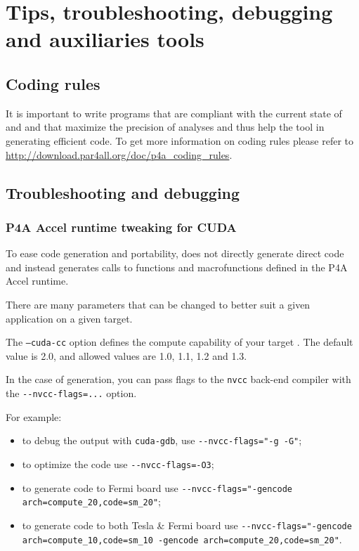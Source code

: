 \documentclass[a4paper]{article}
\begin{document}
\section{Tips, troubleshooting, debugging and auxiliaries tools}

\subsection{Coding rules}
It is important to write programs that are compliant with the
current state of \Apfa and \Apips and that maximize the precision of analyses and
thus help the tool in generating efficient code. To get more information on \Apfa 
coding rules please refer to \url{http://download.par4all.org/doc/p4a_coding_rules}.

\subsection{Troubleshooting and debugging}

\subsubsection{P4A Accel runtime tweaking for CUDA}
\label{sec:p4a-accel-runtime}

To ease code generation and portability, \Apfa does not directly generate
direct \Acuda code and instead generates calls to functions and
macrofunctions defined in the P4A Accel runtime.

There are many parameters that can be changed to better suit a given
application on a given target. 

The \texttt{--cuda-cc} option defines the compute capability of your target 
\Agpu. The default value is 2.0, and allowed values are 1.0, 1.1, 1.2 and 1.3. 

In the case of \Acuda generation, you can pass flags to the \texttt{nvcc}
back-end compiler with the \verb|--nvcc-flags=...| option.

For example:
\begin{itemize}
\item to debug the output with \texttt{cuda-gdb}, use
  \verb|--nvcc-flags="-g -G"|;
\item to optimize the \Acuda code use \verb|--nvcc-flags=-O3|;
\item  to generate code to Fermi board use
  \verb|--nvcc-flags="-gencode arch=compute_20,code=sm_20"|;
\item to generate code to both Tesla \& Fermi board use
  \verb|--nvcc-flags="-gencode arch=compute_10,code=sm_10 -gencode arch=compute_20,code=sm_20"|.
\end{itemize}
\end{document}

